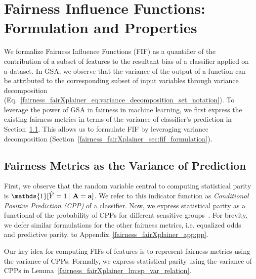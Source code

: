 \section{Fairness Influence Functions: Formulation and Properties}\label{fairness_fairXplainer_sec:fifs}
We formalize Fairness Influence Functions (FIF) as a quantifier of the contribution of a subset of features to the resultant bias of a classifier applied on a dataset.  In GSA, we observe that the variance of the output of a function can be attributed to the corresponding subset of input variables through variance decomposition (Eq.~\eqref{fairness_fairXplainer_eq:variance_decomposition_set_notation}). To leverage the power of GSA in fairness in machine learning, we first express the existing fairness metrics in terms of the variance of classifier's prediction in Section~\ref{fairness_fairXplainer_sec:metric_as_variance}. This allows us to formulate FIF by leveraging variance decomposition (Section~\ref{fairness_fairXplainer_sec:fif_formulation}). 


\subsection{Fairness Metrics as the Variance of Prediction}
\label{fairness_fairXplainer_sec:metric_as_variance}

First, we observe that the random variable central to computing statistical parity is $ \mathds{1}[\widehat{Y} = 1 \mid \sensitive = \mathbf{a}] $.
We refer to this indicator function as \textit{Conditional Positive Prediction (CPP)} of a classifier. Now, we express statistical parity as a functional of the probability of CPPs for different sensitive groups~\cite{ghosh2020justicia,benesse2021fairness}. For brevity, we defer similar formulations for the other fairness metrics, i.e. equalized odds and predictive parity, to Appendix~\ref{fairness_fairXplainer_app:pp}. %

Our key idea for computing FIFs of features is to represent fairness metrics using the variance of CPPs. Formally, we express statistical parity using the variance of CPPs in Lemma~\ref{fairness_fairXplainer_lm:sp_var_relation}.


